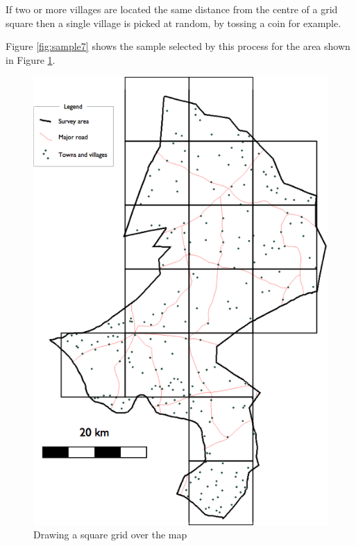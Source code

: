 \documentclass[12pt,a4paper]{book}
\theoremstyle{definition}
\theoremstyle{definition}
\theoremstyle{definition}
\theoremstyle{remark}
\begin{document}
If two or more villages are located the same distance from the centre of
a grid square then a single village is picked at random, by tossing a
coin for example.

Figure \ref{fig:sample7} shows the sample selected by this process for
the area shown in Figure \ref{fig:sample6}.

\begin{figure}[H]

{\centering \includegraphics[width=6.97in]{figures/mapSample2} 

}

\caption{Drawing a square grid over the map}\label{fig:sample6}
\end{figure}
\end{document}

